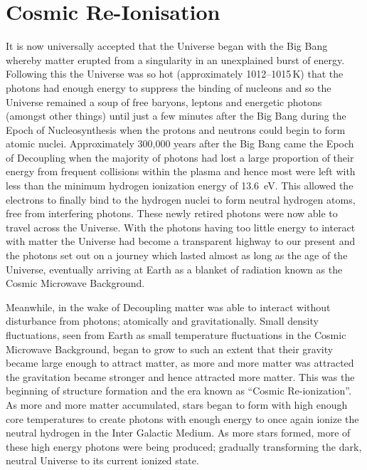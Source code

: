 
\section{Cosmic Re-Ionisation} %
\label{sec:cosmic_re_ionisation}
	It is now universally accepted that the Universe began with the Big Bang whereby matter erupted from a singularity in an unexplained burst of energy. Following this the Universe was so hot (approximately 1012--1015\,\si{\kelvin})\cite{liddle2003introduction} that the photons had enough energy to suppress the binding of nucleons and so the Universe remained a soup of free baryons, leptons and energetic photons (amongst other things) until just a few minutes after the Big Bang during the Epoch of Nucleosynthesis when the protons and neutrons could begin to form atomic nuclei. Approximately 300,000\cite{liddle2003introduction} years after the Big Bang came the Epoch of Decoupling when the majority of photons had lost a large proportion of their energy from frequent collisions within the plasma and hence most were left with less than the minimum hydrogen ionization energy of \SI{13.6}{\electronvolt}. This allowed the electrons to finally bind to the hydrogen nuclei to form neutral hydrogen atoms, free from interfering photons. These newly retired photons were now able to travel across the Universe. With the photons having too little energy to interact with matter the Universe had become a transparent highway to our present and the photons set out on a journey which lasted almost as long as the age of the Universe, eventually arriving at Earth as a blanket of radiation known as the Cosmic Microwave Background.

	Meanwhile, in the wake of Decoupling matter was able to interact without disturbance from photons; atomically and gravitationally. Small density fluctuations, seen from Earth as small temperature fluctuations in the Cosmic Microwave Background, began to grow to such an extent that their gravity became large enough to attract matter, as more and more matter was attracted the gravitation became stronger and hence attracted more matter. This was the beginning of structure formation and the era known as ``Cosmic Re-ionization''. As more and more matter accumulated, stars began to form with high enough core temperatures to create photons with enough energy to once again ionize the neutral hydrogen in the Inter Galactic Medium. As more stars formed, more of these high energy photons were being produced; gradually transforming the dark, neutral Universe to its current ionized state.

